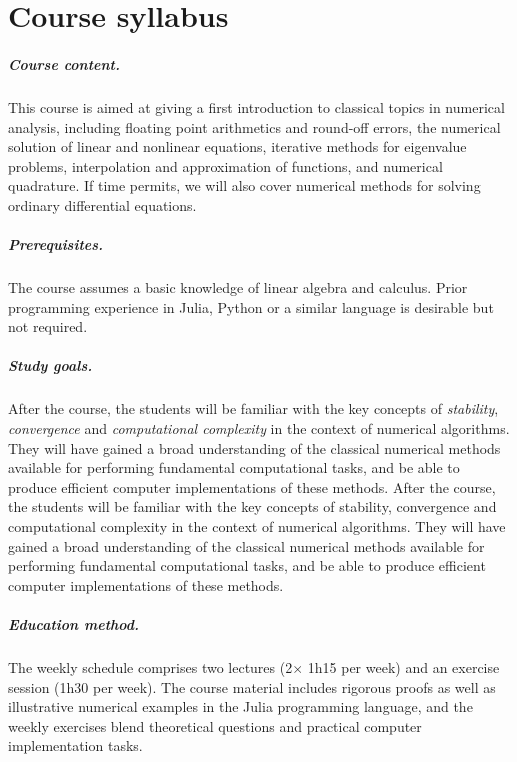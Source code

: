\chapter*{Course syllabus}%

\paragraph{Course content.}%
This course is aimed at giving a first introduction to classical topics in numerical analysis,
including floating point arithmetics and round-off errors,
the numerical solution of linear and nonlinear equations,
iterative methods for eigenvalue problems,
interpolation and approximation of functions,
and numerical quadrature.
If time permits, we will also cover numerical methods for solving ordinary differential equations.

\paragraph{Prerequisites.}%
The course assumes a basic knowledge of linear algebra and calculus.
Prior programming experience in Julia, Python or a similar language is desirable but not required.

\paragraph{Study goals.}%
After the course,
the students will be familiar with the key concepts of \emph{stability}, \emph{convergence} and \emph{computational complexity} in the context of numerical algorithms.
They will have gained a broad understanding of the classical numerical methods available for performing fundamental computational tasks,
and be able to produce efficient computer implementations of these methods.
After the course, the students will be familiar with the key concepts of stability, convergence and computational complexity in the context of numerical algorithms. They will have gained a broad understanding of the classical numerical methods available for performing fundamental computational tasks, and be able to produce efficient computer implementations of these methods.

\paragraph{Education method.}%
The weekly schedule comprises two lectures (2$\times$ 1h15 per week) and an exercise session (1h30 per week).
The course material includes rigorous proofs as well as illustrative numerical examples in the Julia programming language,
and the weekly exercises blend theoretical questions and practical computer implementation tasks.

